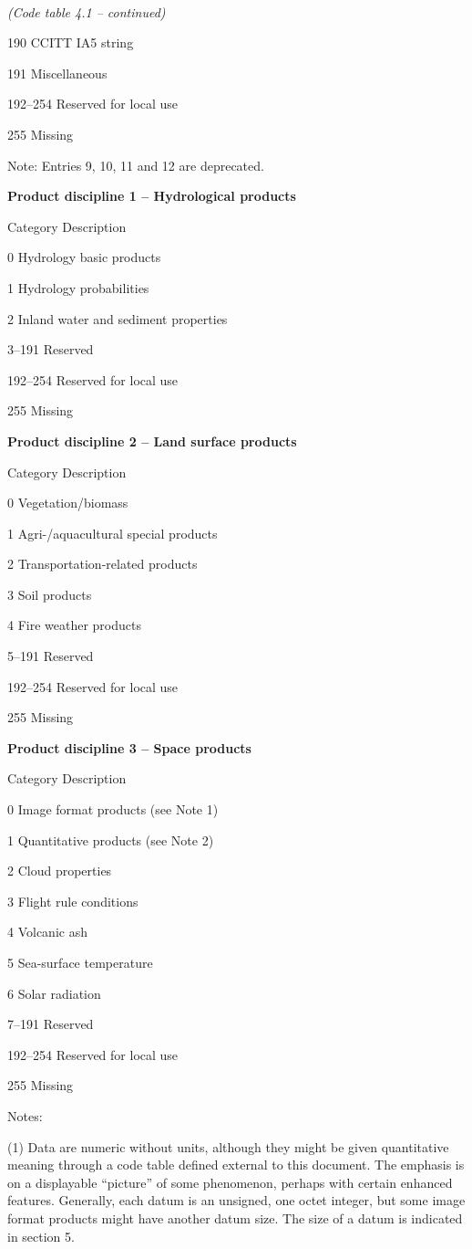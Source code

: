 \emph{\\
(Code table 4.1 -- continued)}

190 CCITT IA5 string

191 Miscellaneous

192--254 Reserved for local use

255 Missing

Note: Entries 9, 10, 11 and 12 are deprecated.

\textbf{Product discipline 1 -- Hydrological products}

Category Description

0 Hydrology basic products

1 Hydrology probabilities

2 Inland water and sediment properties

3--191 Reserved

192--254 Reserved for local use

255 Missing

\textbf{Product discipline 2 -- Land surface products}

Category Description

0 Vegetation/biomass

1 Agri-/aquacultural special products

2 Transportation-related products

3 Soil products

4 Fire weather products

5--191 Reserved

192--254 Reserved for local use

255 Missing

\textbf{Product discipline 3 -- Space products}

Category Description

0 Image format products (see Note 1)

1 Quantitative products (see Note 2)

2 Cloud properties

3 Flight rule conditions

4 Volcanic ash

5 Sea-surface temperature

6 Solar radiation

7--191 Reserved

192--254 Reserved for local use

255 Missing

Notes:

(1) Data are numeric without units, although they might be given quantitative meaning through a code table defined external to this document. The emphasis is on a displayable ``picture'' of some phenomenon, perhaps with certain enhanced features. Generally, each datum is an unsigned, one octet integer, but some image format products might have another datum size. The size of a datum is indicated in section 5.

